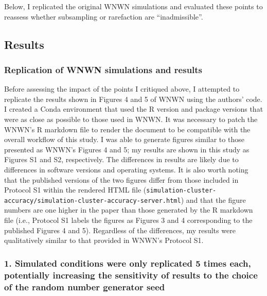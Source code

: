 \documentclass[
]{article}
\begin{document}
Below, I replicated the original WNWN simulations and evaluated these
points to reassess whether subsampling or rarefaction are
``inadmissible''.

\hypertarget{results}{%
\subsection{Results}\label{results}}

\hypertarget{replication-of-wnwn-simulations-and-results}{%
\subsubsection{Replication of WNWN simulations and
results}\label{replication-of-wnwn-simulations-and-results}}

Before assessing the impact of the points I critiqued above, I attempted
to replicate the results shown in Figures 4 and 5 of WNWN using the
authors' code. I created a Conda environment that used the R version and
package versions that were as close as possible to those used in WNWN.
It was necessary to patch the WNWN's R markdown file to render the
document to be compatible with the overall workflow of this study. I was
able to generate figures similar to those presented as WNWN's Figures 4
and 5; my results are shown in this study as Figures S1 and S2,
respectively. The differences in results are likely due to differences
in software versions and operating systems. It is also worth noting that
the published versions of the two figures differ from those included in
Protocol S1 within the rendered HTML file
(\texttt{simulation-cluster-accuracy/simulation-cluster-accuracy-server.html})
and that the figure numbers are one higher in the paper than those
generated by the R markdown file (i.e., Protocol S1 labels the figures
as Figures 3 and 4 corresponding to the published Figures 4 and 5).
Regardless of the differences, my results were qualitatively similar to
that provided in WNWN's Protocol S1.

\hypertarget{simulated-conditions-were-only-replicated-5-times-each-potentially-increasing-the-sensitivity-of-results-to-the-choice-of-the-random-number-generator-seed}{%
\subsubsection{1. Simulated conditions were only replicated 5 times
each, potentially increasing the sensitivity of results to the choice of
the random number generator
seed}\label{simulated-conditions-were-only-replicated-5-times-each-potentially-increasing-the-sensitivity-of-results-to-the-choice-of-the-random-number-generator-seed}}
\end{document}
